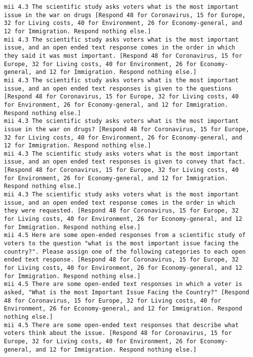 \begin{lstlisting}[label=lst:promptvariants]
mii	4.3	The scientific study asks voters what is the most important issue in the war on drugs [Respond 48 for Coronavirus, 15 for Europe, 32 for Living costs, 40 for Environment, 26 for Economy-general, and 12 for Immigration. Respond nothing else.]
mii	4.3	The scientific study asks voters what is the most important issue, and an open ended text response comes in the order in which they said it was most important. [Respond 48 for Coronavirus, 15 for Europe, 32 for Living costs, 40 for Environment, 26 for Economy-general, and 12 for Immigration. Respond nothing else.]
mii	4.3	The scientific study asks voters what is the most important issue, and an open ended text responses is given to the questions [Respond 48 for Coronavirus, 15 for Europe, 32 for Living costs, 40 for Environment, 26 for Economy-general, and 12 for Immigration. Respond nothing else.]
mii	4.3	The scientific study asks voters what is the most important issue in the war on drugs? [Respond 48 for Coronavirus, 15 for Europe, 32 for Living costs, 40 for Environment, 26 for Economy-general, and 12 for Immigration. Respond nothing else.]
mii	4.3	The scientific study asks voters what is the most important issue, and an open ended text responses is given to convey that fact. [Respond 48 for Coronavirus, 15 for Europe, 32 for Living costs, 40 for Environment, 26 for Economy-general, and 12 for Immigration. Respond nothing else.]
mii	4.3	The scientific study asks voters what is the most important issue, and an open ended text response comes in the order in which they were requested. [Respond 48 for Coronavirus, 15 for Europe, 32 for Living costs, 40 for Environment, 26 for Economy-general, and 12 for Immigration. Respond nothing else.]
mii	4.5	Here are some open-ended responses from a scientific study of voters to the question "what is the most important issue facing the country?". Please assign one of the following categories to each open ended text response. [Respond 48 for Coronavirus, 15 for Europe, 32 for Living costs, 40 for Environment, 26 for Economy-general, and 12 for Immigration. Respond nothing else.]
mii	4.5	There are some open-ended text responses in which a voter is asked, "What is the most Important Issue Facing the Country?" [Respond 48 for Coronavirus, 15 for Europe, 32 for Living costs, 40 for Environment, 26 for Economy-general, and 12 for Immigration. Respond nothing else.]
mii	4.5	There are some open-ended text responses that describe what voters think about the issue. [Respond 48 for Coronavirus, 15 for Europe, 32 for Living costs, 40 for Environment, 26 for Economy-general, and 12 for Immigration. Respond nothing else.]

\end{lstlisting}
